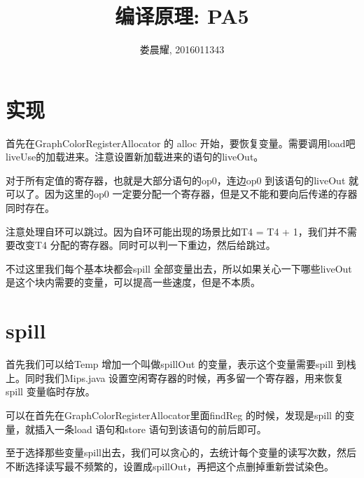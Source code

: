 \documentclass{article}
\title{编译原理: PA5}
\author{娄晨耀, 2016011343}
\date{}
\theoremstyle{plain}
\theoremstyle{definition}
\begin{document}
    \maketitle

    \section{实现}

    首先在GraphColorRegisterAllocator 的 alloc 开始，要恢复变量。需要调用load吧liveUse的加载进来。注意设置新加载进来的语句的liveOut。

    对于所有定值的寄存器，也就是大部分语句的op0，连边op0 到该语句的liveOut 就可以了。因为这里的op0 一定要分配一个寄存器，但是又不能和要向后传递的存器同时存在。
    
    注意处理自环可以跳过。因为自环可能出现的场景比如T4 = T4 + 1，我们并不需要改变T4 分配的寄存器。同时可以判一下重边，然后给跳过。
    
    不过这里我们每个基本块都会spill 全部变量出去，所以如果关心一下哪些liveOut 是这个块内需要的变量，可以提高一些速度，但是不本质。

    \section{spill}

    首先我们可以给Temp 增加一个叫做spillOut 的变量，表示这个变量需要spill 到栈上。同时我们Mips.java 设置空闲寄存器的时候，再多留一个寄存器，用来恢复spill 变量临时存放。
    
    可以在首先在GraphColorRegisterAllocator里面findReg 的时候，发现是spill 的变量，就插入一条load 语句和store 语句到该语句的前后即可。

    至于选择那些变量spill出去，我们可以贪心的，去统计每个变量的读写次数，然后不断选择读写最不频繁的，设置成spillOut，再把这个点删掉重新尝试染色。

    
\end{document}
